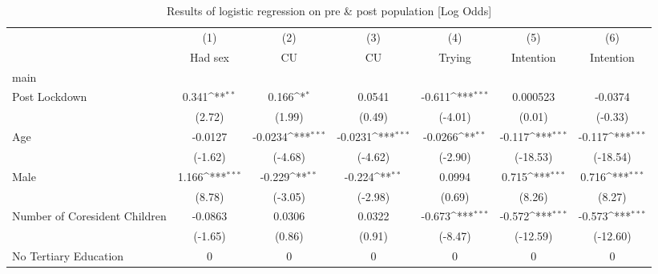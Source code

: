 \begin{table}[htbp]\centering
\def\sym#1{\ifmmode^{#1}\else\(^{#1}\)\fi}
\caption{Results of logistic regression on pre \& post population [Log Odds]}
\begin{tabular}{l*{6}{c}}
\hline\hline
                    &\multicolumn{1}{c}{(1)}&\multicolumn{1}{c}{(2)}&\multicolumn{1}{c}{(3)}&\multicolumn{1}{c}{(4)}&\multicolumn{1}{c}{(5)}&\multicolumn{1}{c}{(6)}\\
                    &\multicolumn{1}{c}{Had sex}&\multicolumn{1}{c}{CU}&\multicolumn{1}{c}{CU}&\multicolumn{1}{c}{Trying}&\multicolumn{1}{c}{Intention}&\multicolumn{1}{c}{Intention}\\
\hline
main                &                     &                     &                     &                     &                     &                     \\
Post Lockdown       &       0.341\sym{**} &       0.166\sym{*}  &      0.0541         &      -0.611\sym{***}&    0.000523         &     -0.0374         \\
                    &      (2.72)         &      (1.99)         &      (0.49)         &     (-4.01)         &      (0.01)         &     (-0.33)         \\
[1em]
Age                 &     -0.0127         &     -0.0234\sym{***}&     -0.0231\sym{***}&     -0.0266\sym{**} &      -0.117\sym{***}&      -0.117\sym{***}\\
                    &     (-1.62)         &     (-4.68)         &     (-4.62)         &     (-2.90)         &    (-18.53)         &    (-18.54)         \\
[1em]
Male                &       1.166\sym{***}&      -0.229\sym{**} &      -0.224\sym{**} &      0.0994         &       0.715\sym{***}&       0.716\sym{***}\\
                    &      (8.78)         &     (-3.05)         &     (-2.98)         &      (0.69)         &      (8.26)         &      (8.27)         \\
[1em]
Number of Coresident Children&     -0.0863         &      0.0306         &      0.0322         &      -0.673\sym{***}&      -0.572\sym{***}&      -0.573\sym{***}\\
                    &     (-1.65)         &      (0.86)         &      (0.91)         &     (-8.47)         &    (-12.59)         &    (-12.60)         \\
[1em]
No Tertiary Education&           0         &           0         &           0         &           0         &           0         &           0         \\

\end{tabular}
\end{table}
